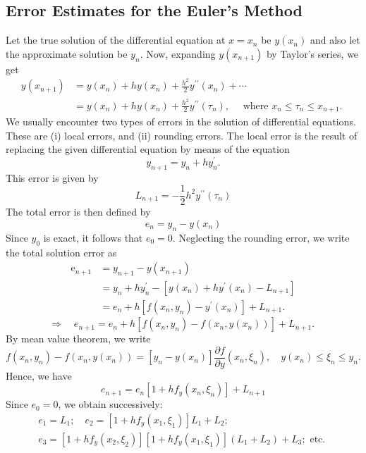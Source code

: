 \documentclass[12pt,a4paper,oneside]{book}
\begin{document}
\subsection{Error Estimates for the Euler's Method}
Let the true solution of the differential equation at $x=x_n$ be $y\left(x_n\right)$ and also let the approximate solution be $y_n$. Now, expanding $y\left(x_{n+1}\right)$ by Taylor's series, we get
$$
\begin{aligned}
	y\left(x_{n+1}\right) & =y\left(x_n\right)+h y\left(x_n\right)+\frac{h^2}{2} y^{\prime \prime}\left(x_n\right)+\cdots \\
	& =y\left(x_n\right)+h y\left(x_n\right)+\frac{h^2}{2} y^{\prime \prime}\left(\tau_n\right), \quad \text { where } x_n \leq \tau_n \leq x_{n+1} \text {. }
\end{aligned}
$$
We usually encounter two types of errors in the solution of differential equations. These are (i) local errors, and (ii) rounding errors. The local error is the result of replacing the given differential equation by means of the equation
$$
y_{n+1}=y_n+h y_n^{\prime} .
$$
This error is given by
$$
L_{n+1}=-\frac{1}{2} h^2 y^{\prime \prime}\left(\tau_n\right)
$$
The total error is then defined by
$$
e_n=y_n-y\left(x_n\right)
$$
Since $y_0$ is exact, it follows that $e_0=0$.
Neglecting the rounding error, we write the total solution error as
$$
\begin{aligned}
	\mathrm{e}_{n+1} & =y_{n+1}-y\left(x_{n+1}\right) \\
	& =y_n+h y_n^{\prime}-\left[y\left(x_n\right)+h y^{\prime}\left(x_n\right)-L_{n+1}\right] \\
	& =e_n+h\left[f\left(x_n, y_n\right)-y^{\prime}\left(x_n\right)\right]+L_{n+1} .
\end{aligned}
$$
$$
\Rightarrow \quad e_{n+1}=e_n+h\left[f\left(x_n, y_n\right)-f\left(x_n, y\left(x_n\right)\right)\right]+L_{n+1} \text {. }
$$
By mean value theorem, we write
$$
f\left(x_n, y_n\right)-f\left(x_n, y\left(x_n\right)\right)=\left[y_n-y\left(x_n\right)\right] \frac{\partial f}{\partial y}\left(x_n, \xi_n\right), \quad y\left(x_n\right) \leq \xi_n \leq y_n .
$$
Hence, we have
$$
e_{n+1}=e_n\left[1+h f_y\left(x_n, \xi_n\right)\right]+L_{n+1}
$$
Since $e_0=0$, we obtain successively:
$$
\begin{array}{c}
	e_1=L_1 ; \quad e_2=\left[1+h f_y\left(x_1, \xi_1\right)\right] L_1+L_2 ; \\
	e_3=\left[1+h f_y\left(x_2, \xi_2\right)\right]\left[1+h f_y\left(x_1, \xi_1\right)\right]\left(L_1+L_2\right)+L_3 ; \text { etc. }
\end{array}
$$
\end{document}
